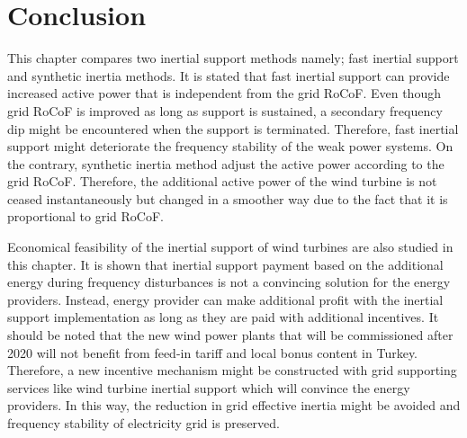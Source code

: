 \section{Conclusion}
This chapter compares two inertial support methods namely; fast inertial support and synthetic inertia methods. It is stated that fast inertial support can provide increased active power that is independent from the grid RoCoF. Even though grid RoCoF is improved as long as support is sustained, a secondary frequency dip might be encountered when the support is terminated. Therefore, fast inertial support might deteriorate the frequency stability of the weak power systems. On the contrary, synthetic inertia method adjust the active power according to the grid RoCoF. Therefore, the additional active power of the wind turbine is not ceased instantaneously but changed in a smoother way due to the fact that it is proportional to grid RoCoF.\par
Economical feasibility of the inertial support of wind turbines are also studied in this chapter. It is shown that inertial support payment based on the additional energy during frequency disturbances is not a convincing solution for the energy providers. Instead, energy provider can make additional profit with the inertial support implementation as long as they are paid with additional incentives. It should be noted that the new wind power plants that will be commissioned after 2020 will not benefit from feed-in tariff and local bonus content in Turkey. Therefore, a new incentive mechanism might be constructed with grid supporting services like wind turbine inertial support which will convince the energy providers. In this way, the reduction in grid effective inertia might be avoided and frequency stability of electricity grid is preserved.